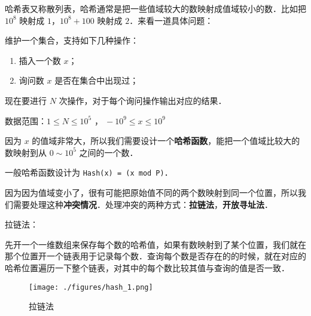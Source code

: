 
哈希表又称散列表，哈希通常是把一些值域较大的数映射成值域较小的数．比如把 $10^8$ 映射成 $1$，$10^8 + 100$ 映射成 $2$．来看一道具体问题：

维护一个集合，支持如下几种操作：

\begin{enumerate}
\item 插入一个数 $x$；

\item 询问数 $x$ 是否在集合中出现过；

\end{enumerate}
现在要进行 $N$ 次操作，对于每个询问操作输出对应的结果．

数据范围：$ 1 \le N \le 10^5$ ，$\ -10^9 \le x \le 10^9$

因为 $x$ 的值域非常大，所以我们需要设计一个\textbf{哈希函数}，能把一个值域比较大的数映射到从 $0 \sim 10^5$ 之间的一个数．

一般哈希函数设计为 \verb|Hash(x) = (x mod P)|．

因为因为值域变小了，很有可能把原始值不同的两个数映射到同一个位置，所以我们需要处理这种\textbf{冲突情况}．处理冲突的两种方式：\textbf{拉链法}，\textbf{开放寻址法}．

拉链法：

先开一个一维数组来保存每个数的哈希值，如果有数映射到了某个位置，我们就在那个位置开一个链表用于记录每个数．查询每个数是否存在的的时候，就在对应的哈希位置遍历一下整个链表，对其中的每个数比较其值与查询的值是否一致．

\begin{figure}[ht]
\centering
\texttt{[image: ./figures/hash\_1.png]}
\caption{拉链法} \label{hash_fig1}
\end{figure}